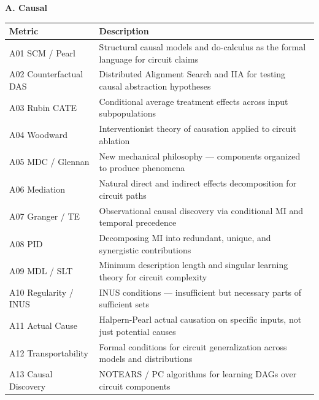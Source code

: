 \documentclass[10pt]{article}
\begin{document}

\begingroup
\small
\setlength{\tabcolsep}{4pt}
\renewcommand{\arraystretch}{1.15}
\noindent\textbf{A. Causal}\par
\vspace{4pt}\noindent{}
\nopagebreak

\centering
\begin{tabular}{@{}lp{10cm}@{}}
\toprule
\textbf{Metric} & \textbf{Description} \\
\midrule
A01 SCM / Pearl & Structural causal models and do-calculus as the formal language for circuit claims \\
\midrule
A02 Counterfactual DAS & Distributed Alignment Search and IIA for testing causal abstraction hypotheses \\
\midrule
A03 Rubin CATE & Conditional average treatment effects across input subpopulations \\
\midrule
A04 Woodward & Interventionist theory of causation applied to circuit ablation \\
\midrule
A05 MDC / Glennan & New mechanical philosophy --- components organized to produce phenomena \\
\midrule
A06 Mediation & Natural direct and indirect effects decomposition for circuit paths \\
\midrule
A07 Granger / TE & Observational causal discovery via conditional MI and temporal precedence \\
\midrule
A08 PID & Decomposing MI into redundant, unique, and synergistic contributions \\
\midrule
A09 MDL / SLT & Minimum description length and singular learning theory for circuit complexity \\
\midrule
A10 Regularity / INUS & INUS conditions --- insufficient but necessary parts of sufficient sets \\
\midrule
A11 Actual Cause & Halpern-Pearl actual causation on specific inputs, not just potential causes \\
\midrule
A12 Transportability & Formal conditions for circuit generalization across models and distributions \\
\midrule
A13 Causal Discovery & NOTEARS / PC algorithms for learning DAGs over circuit components \\
\bottomrule
\end{tabular}
\medskip
\end{document}
